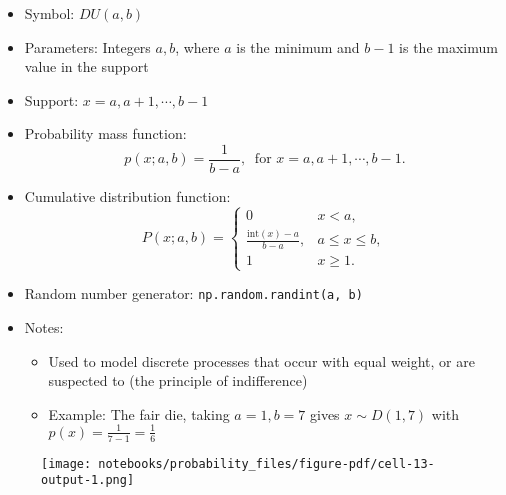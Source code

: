 \documentclass[
  letterpaper,
  DIV=11,
  numbers=noendperiod]{scrreprt}
\newenvironment{Shaded}{\begin{snugshade}}{\end{snugshade}}
\newcommand{\DecValTok}[1]{\textcolor[rgb]{0.68,0.00,0.00}{#1}}
\newcommand{\NormalTok}[1]{\textcolor[rgb]{0.00,0.23,0.31}{#1}}
\newcommand{\OperatorTok}[1]{\textcolor[rgb]{0.37,0.37,0.37}{#1}}
\newcommand{\SpecialCharTok}[1]{\textcolor[rgb]{0.37,0.37,0.37}{#1}}
\newcommand{\SpecialStringTok}[1]{\textcolor[rgb]{0.13,0.47,0.30}{#1}}
\newcommand{\StringTok}[1]{\textcolor[rgb]{0.13,0.47,0.30}{#1}}
\newcommand{\VariableTok}[1]{\textcolor[rgb]{0.07,0.07,0.07}{#1}}
\providecommand{\tightlist}{%
  \setlength{\itemsep}{0pt}\setlength{\parskip}{0pt}}\usepackage{longtable,booktabs,array}
\begin{document}
\begin{itemize}
\tightlist
\item
  Symbol: \(DU(a,b)\)
\item
  Parameters: Integers \(a, b\), where \(a\) is the minimum and \(b-1\)
  is the maximum value in the support
\item
  Support: \(x=a,a+1,\cdots,b-1\)
\item
  Probability mass function:
  \[p(x; a,b) = \frac{1}{b-a}, \ \text{ for } x = a, a+1, \cdots, b-1.\]
\item
  Cumulative distribution function: \[
  P(x; a,b) = 
  \begin{cases}
  0 & x < a, \\
  \frac{\text{int}(x) - a}{b-a}, & a \leq x \leq b, \\
  1 & x \geq 1.
  \end{cases}
  \]
\item
  Random number generator: \texttt{np.random.randint(a,\ b)}
\item
  Notes:

  \begin{itemize}
  \tightlist
  \item
    Used to model discrete processes that occur with equal weight, or
    are suspected to (the principle of indifference)
  \item
    Example: The fair die, taking \(a=1, b=7\) gives \(x \sim D(1,7)\)
    with \(p(x) = \frac{1}{7-1} = \frac{1}{6}\)
  \end{itemize}
\end{itemize}

\begin{Shaded}
\end{Shaded}

\begin{figure}[H]

{\centering \texttt{[image: notebooks/probability\_files/figure-pdf/cell-13-output-1.png]}

}

\end{figure}
\end{document}
